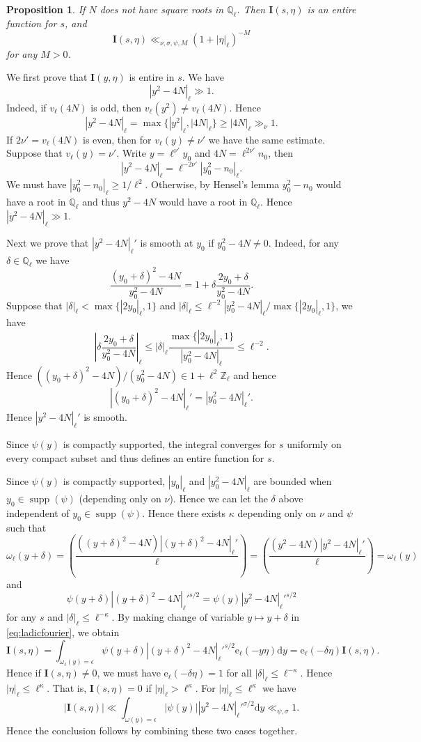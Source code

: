 \documentclass[10pt,oneside,reqno]{amsart}
\makeatletter
\newcommand\rmd{\mathrm{d}}
\newcommand\rme{\mathrm{e}}
\newcommand\bI{\mathbf{I}}
\newcommand\QQ{\mathbb{Q}}
\newcommand\ZZ{\mathbb{Z}}
\DeclareMathOperator\supp{supp}
\renewcommand\leq{\leqslant}
\renewcommand\geq{\geqslant}
\newcommand\legendresymbol[2]{\genfrac{(}{)}{}{}{#1}{#2}}
\theoremstyle{THEOREM}
\newtheorem{proposition}[theorem]{Proposition}
\theoremstyle{DEFINITION}
\theoremstyle{EXERCISE}
\numberwithin{equation}{section}
\renewenvironment{proof}[1][\proofname]{\par
  \vspace{-6pt}
  \pushQED{\qed}
  \normalfont \topsep6\p@\@plus6\p@\relax
  \trivlist
  \item[\hskip\labelsep\rmfamily\bfseries
    #1\@addpunct{:}]\ignorespaces
}{
  \popQED\endtrivlist\@endpefalse
  \vspace{-6pt}
}
\makeatother
\begin{document}
\begin{proposition}\label{prop:ladicsmooth}
If $N$ does not have square roots in $\QQ_\ell$. Then $\bI(s,\eta)$ is an entire function for $s$, and
\[
\bI(s,\eta)\ll_{\nu,\sigma,\psi,M} (1+|\eta|_\ell)^{-M}
\]
for any $M>0$.
\end{proposition}
\begin{proof}
We first prove that $\bI(y,\eta)$ is entire in $s$. We have
\[
|y^2-4N|_\ell\gg 1.
\]
Indeed, if $v_\ell(4N)$ is odd, then $v_\ell(y^2)\neq v_\ell(4N)$. Hence
\[
|y^2-4N|_\ell=\max\{|y^2|_\ell,|4N|_\ell\}\geq |4N|_\ell \gg_{\nu} 1.
\]
If $2\nu'=v_\ell(4N)$ is even, then for $v_\ell(y)\neq \nu'$ we have the same estimate. Suppose that $v_\ell(y)= \nu'$. Write $y=\ell^{\nu'}y_0$ and $4N=\ell^{2\nu'}n_0$, then
\[
|y^2-4N|_\ell=\ell^{-2\nu'}|y_0^2-n_0|_\ell.
\]
We must have $|y_0^2-n_0|_\ell\geq 1/\ell^2$. Otherwise, by Hensel's lemma $y_0^2-n_0$ would have a root in $\QQ_\ell$ and thus $y^2-4N$ would have a root in $\QQ_\ell$. Hence $|y^2-4N|_\ell\gg 1$. 

Next we prove that $|y^2-4N|_\ell'$ is smooth at $y_0$ if $y_0^2-4N\neq 0$. Indeed, for any $\delta\in \QQ_\ell$ we have
\[
\frac{(y_0+\delta)^2-4N}{y_0^2-4N}=1+\delta\frac{2y_0+\delta}{y_0^2-4N}.
\]
Suppose that $|\delta|_\ell<\max\{|2y_0|_\ell,1\}$ and $|\delta|_\ell\leq \ell^{-2}|y_0^2-4N|_\ell/\max\{|2y_0|_\ell,1\}$, we have
\[
\left|\delta\frac{2y_0+\delta}{y_0^2-4N}\right|_\ell\leq |\delta|_\ell\frac{\max\{|2y_0|_\ell,1\}}{|y_0^2-4N|_\ell}\leq \ell^{-2}.
\]
Hence $((y_0+\delta)^2-4N)/(y_0^2-4N)\in 1+\ell^2\ZZ_\ell$ and hence
\[
|(y_0+\delta)^2-4N|_\ell'=|y_0^2-4N|_\ell'.
\]
Hence $|y^2-4N|_\ell'$ is smooth.

Since $\psi(y)$ is compactly supported, the integral converges for $s$ uniformly on every compact subset and thus defines an entire function for $s$. 
 
Since $\psi(y)$ is compactly supported, $|y_0|_\ell$ and $|y_0^2-4N|_\ell$ are bounded when $y_0\in \supp(\psi)$ (depending only on $\nu$). Hence we can let the $\delta$ above independent of $y_0\in \supp(\psi)$. Hence there exists $\kappa$ depending only on $\nu$ and $\psi$ such that 
\[
\omega_\ell(y+\delta)=\legendresymbol{((y+\delta)^2-4N)|(y+\delta)^2-4N|_\ell'}{\ell}= \legendresymbol{(y^2-4N)|y^2-4N|_\ell'}{\ell}=\omega_\ell(y)
\]
and
\[
\psi(y+\delta)|(y+\delta)^2-4N|_\ell'^{s/2}=\psi(y)|y^2-4N|_\ell'^{s/2}
\]
for any $s$ and $|\delta|_\ell\leq \ell^{-\kappa}$. By making change of variable $y\mapsto y+\delta$ in \eqref{eq:ladicfourier}, we obtain
\[
\bI(s,\eta)= \int_{\omega_\ell(y)=\epsilon}\psi(y+\delta)|(y+\delta)^2-4N|_\ell'^{s/2} \rme_\ell(-y\eta)\rmd y=\rme_\ell(-\delta\eta)\bI(s,\eta).
\]
Hence if $\bI(s,\eta)\neq 0$, we must have $\rme_\ell(-\delta\eta)=1$ for all $|\delta|_\ell\leq \ell^{-\kappa}$. Hence $|\eta|_\ell\leq \ell^\kappa$. That is, $\bI(s,\eta)=0$ if $|\eta|_\ell> \ell^\kappa$. For $|\eta|_\ell\leq \ell^\kappa$ we have
\[
|\bI(s,\eta)|\ll  \int_{\omega(y)=\epsilon}|\psi(y)||y^2-4N|_\ell'^{\sigma/2}\rmd y\ll_{\psi,\sigma} 1.
\]
Hence the conclusion follows by combining these two cases together.
\end{proof}
\end{document}
